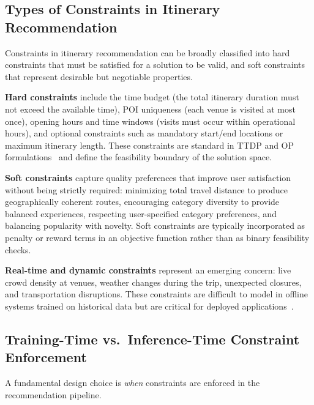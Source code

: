 \subsection{Types of Constraints in Itinerary Recommendation}
\label{sec:sota-decoding-types}

Constraints in itinerary recommendation can be broadly classified into hard constraints that must be satisfied for a solution to be valid, and soft constraints that represent desirable but negotiable properties.

\textbf{Hard constraints} include the time budget (the total itinerary duration must not exceed the available time), POI uniqueness (each venue is visited at most once), opening hours and time windows (visits must occur within operational hours), and optional constraints such as mandatory start/end locations or maximum itinerary length. These constraints are standard in TTDP and OP formulations~\cite{gavalas2014ttdp, vansteenwegen2011op} and define the feasibility boundary of the solution space.

\textbf{Soft constraints} capture quality preferences that improve user satisfaction without being strictly required: minimizing total travel distance to produce geographically coherent routes, encouraging category diversity to provide balanced experiences, respecting user-specified category preferences, and balancing popularity with novelty. Soft constraints are typically incorporated as penalty or reward terms in an objective function rather than as binary feasibility checks.

\textbf{Real-time and dynamic constraints} represent an emerging concern: live crowd density at venues, weather changes during the trip, unexpected closures, and transportation disruptions. These constraints are difficult to model in offline systems trained on historical data but are critical for deployed applications~\cite{bowen2020crowdedness}.

\subsection{Training-Time vs.\ Inference-Time Constraint Enforcement}
\label{sec:sota-decoding-when}

A fundamental design choice is \emph{when} constraints are enforced in the recommendation pipeline.

